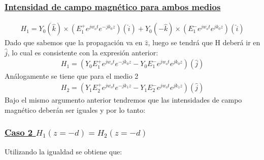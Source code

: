 \documentclass[
  11pt,
  letterpaper,
   addpoints,
   answers
  ]{exam}
\begin{document}
\begin{questions}
\begin{solution}
\begin{enumerate}
            \subsubsection*{\underline{Intensidad de campo magnético para ambos medios }}
            \begin{align}
                H_{1} = Y_{0}(\hat{k}) \times ( E_{1}^{+}e^{jw_{o}t}e^{-jk_{0}z}) (\hat{i}) + Y_{0}(-\hat{k}) \times ( E_{1}^{-}e^{jw_{o}t}e^{jk_{0}z})(\hat{i}) 
            \end{align}
            Dado que sabemos que la propagación va en $\hat{z}$, luego se tendrá que H deberá ir en $\hat{j}$, lo cual es consistente con la expresión anterior:
            \begin{align}
                H_{1}= ( Y_{0}E_{1}^{+}e^{jw_{o}t}e^{-jk_{0}z} - Y_{0} E_{1}^{-}e^{jw_{o}t}e^{jk_{0}z})(\hat{j})
            \end{align}
            Análogamente se tiene que para el medio 2 
            \begin{align}
                H_{2}= ( Y_{1}E_{2}^{+}e^{jw_{o}t}e^{-jk_{1}z} - Y_{1} E_{2}^{-}e^{jw_{o}t}e^{jk_{1}z})(\hat{j})
            \end{align}
            Bajo el mismo argumento anterior tendremos que las intensidades de campo magnético deberán ser iguales y por lo tanto:
            \subsubsection*{\underline{Caso 2 $H_{1}(z=-d)=H_{2}(z=-d)$ }}
            Utilizando la igualdad se obtiene que:
            

\end{enumerate}
\end{solution}
\end{questions}
\end{document}
